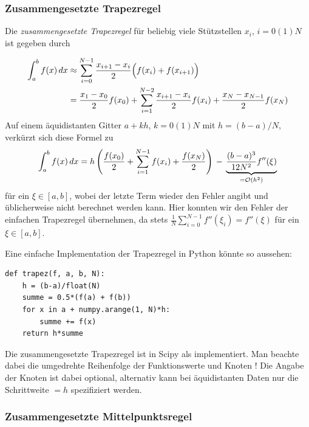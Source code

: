 \subsubsection{Zusammengesetzte Trapezregel}
\begin{minipage}[t]{0.74\linewidth}
  Die \emph{zusammengesetzte Trapezregel} für beliebig viele
  Stützstellen $x_i$, $i=0(1)N$ ist gegeben durch
\end{minipage}
\begin{align}
  \label{eq:trapezzusammen}
  \int_a^b f(x)\, dx &\approx \sum_{i=0}^{N-1} \frac{x_{i+1} -
    x_i}{2}\Bigl(f(x_i) + f(x_{i+1})\Bigr)\nonumber\\
  &= \frac{x_1-x_0}{2}f(x_0) + \sum_{i=1}^{N-2} \frac{x_{i+1} - x_{i}}{2}
  f(x_i) + \frac{x_N-x_{N-1}}{2}f(x_N)
\end{align}
Auf einem äquidistanten Gitter $a + kh$,
$k=0(1)N$ mit $h=(b-a)/N$, verkürzt sich diese Formel zu
\begin{equation}
  \int_a^b f(x)\, dx =
  h\left(\frac{f(x_0)}{2} + \sum_{i=1}^{N-1} f(x_i) +
    \frac{f(x_N)}{2}\right)
  \,-\, \underbrace{\frac{(b-a)^3}{12 N^2}f''(\xi)}_{=\mathcal O(h^2)}
\end{equation}
für ein $\xi\in [a,b]$, wobei der letzte Term wieder den Fehler angibt
und üblicherweise nicht berechnet werden kann. Hier konnten wir den
Fehler der einfachen Trapezregel übernehmen, da stets $\frac{1}{N}
\sum_{i=0}^{N-1} f''(\xi_i) = f''(\xi)$ für ein $\xi\in[a,b]$.

Eine einfache Implementation der Trapezregel in Python könnte so
aussehen:
\begin{lstlisting}
def trapez(f, a, b, N):
    h = (b-a)/float(N)
    summe = 0.5*(f(a) + f(b))
    for x in a + numpy.arange(1, N)*h:
        summe += f(x)
    return h*summe
\end{lstlisting}

Die zusammengesetzte Trapezregel ist in Scipy als
 implementiert. Man beachte dabei
die umgedrehte Reihenfolge der Funktionswerte  und Knoten
! Die Angabe der Knoten ist dabei optional, alternativ kann
bei äquidistanten Daten nur die Schrittweite $=h$
spezifiziert werden.

\subsubsection{Zusammengesetzte Mittelpunktsregel}

